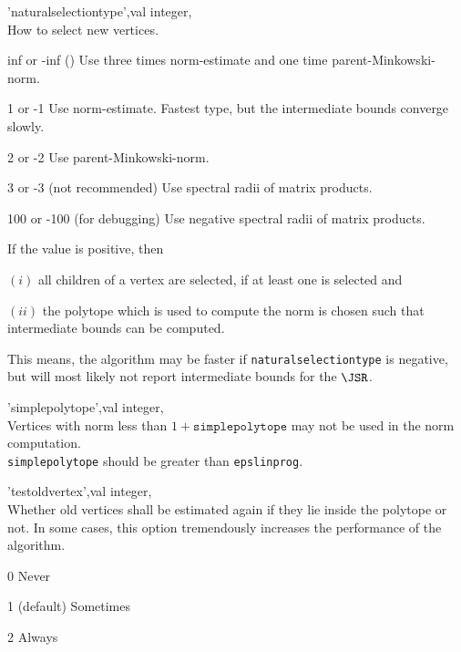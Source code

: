 \begin{param}
\item['naturalselectiontype',val] integer, \\How to select new vertices.
\begin{param}
\item[inf or -inf] () Use three times norm-estimate and one time parent-Minkowski-norm.
\item[1 or -1] Use norm-estimate. Fastest type, but the intermediate bounds converge slowly.
\item[2 or -2] Use parent-Minkowski-norm.
\item[3 or -3] (not recommended) Use spectral radii of matrix products.
\item[100 or -100] (for debugging) Use negative spectral radii of matrix products.
\end{param}
If the value is positive, then 
\begin{param}
\item[$(i)$] all children of a vertex are selected, if at least one is selected and
\item[$(ii)$] the polytope which is used to compute the norm is chosen such that intermediate bounds can be computed.
\end{param}
This means, the algorithm may be faster if \texttt{naturalselectiontype} is negative, but will most likely not report intermediate bounds for the $\JSR$.

\item['simplepolytope',val] integer, \\Vertices with norm less than $1+\texttt{simplepolytope}$ may not be used in the norm computation.\\ \texttt{simplepolytope} should be greater than \texttt{epslinprog}.

\item['testoldvertex',val] integer, \\Whether old vertices shall be estimated again if they lie inside the polytope or not. In some cases, this option tremendously increases the performance of the algorithm.
\begin{param}
\item[0] Never
\item[1] (default) Sometimes
\item[2] Always
\end{param}

\end{param}

